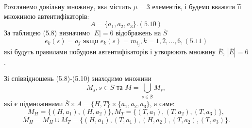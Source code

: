 \begin{example}
    Розглянемо довільну множину, яка містить $\mu = 3$ елементів, і будемо
    вважати її множиною автентифікаторів:
    \begin{equation}
        A = \{a_1, a_2, a_3\}. (5.10)
    \end{equation}
    За таблицею (5.8) визначимо $|E| = 6$ відображень на $\overline{S}$
    \begin{equation*}
        \overline{e}_k(s) = a_j \text{ якщо } e_k(s) = m_{i_j}, k = 1, 2, ..., 6, (5.11)
    \end{equation*}
    які будуть правилами побудови автентифікаторів і утворюють множину
    $\overline{E}$, $|\overline{E}|=6$.

    Зі співвідношень (5.8)-(5.10) знаходимо множини
    \begin{equation*}
        M_s, s \in \overline{S} \text{ та } \overline{M} = \bigcup\limits_{s \in \overline{S}} M_s,
    \end{equation*}
    які є підмножинами $\overline{S} \times A = \{H, T\} \times\{a_1, a_2, a_3\}$, а саме:
    \begin{equation*}
        M_H = \{(H, a_1), (H, a_2)\}, M_T = \{(T, a_1), (T, a_2), (T, a_3)\},
    \end{equation*}
    \begin{equation*}
        \overline{M}_H = M_H \cup M_T = \{(H, a_1), (T, a_1), (H, a_2), (T, a_2), (T, a_3)\}.
    \end{equation*}


\end{example}
